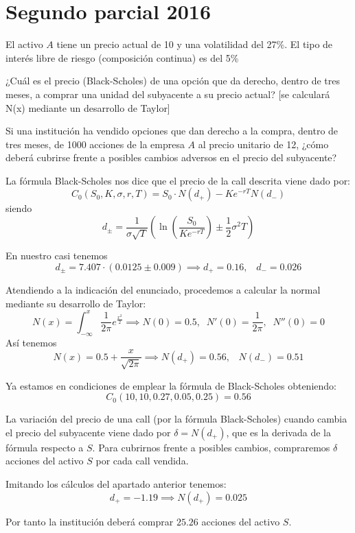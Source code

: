 \section{Segundo parcial 2016}
\begin{problem}[1]
El activo $A$ tiene un precio actual de 10 y una volatilidad del 27\%. El tipo de interés libre de riesgo (composición continua) es del 5\%

\ppart ¿Cuál es el precio (Black-Scholes) de una opción que da derecho, dentro de tres meses, a comprar una unidad del subyacente a su precio actual? [se calculará N(x) mediante un desarrollo de Taylor]

\ppart Si una institución ha vendido opciones que dan derecho a la compra, dentro de tres meses, de 1000 acciones de la empresa $A$ al precio unitario de 12, ¿cómo deberá cubrirse frente a posibles cambios adversos en el precio del subyacente?
\solution
{}

\spart

La fórmula Black-Scholes nos dice que el precio de la call descrita viene dado por:
\[C_0(S_0,K,σ,r,T) = S_0\cdot N(d_+)-Ke^{-rT}N(d_-) \]
siendo
\[d_{\pm} = \frac{1}{σ\sqrt{T}}\left(\ln\left(\frac{S_0}{Ke^{-rT}}  \right) \pm \frac{1}{2}σ^2T\right)\]

En nuestro casi tenemos
\[d_{\pm} = 7.407 \cdot \left( 0.0125 \pm 0.009\right) \implies d_+ = 0.16, \;\;\; d_- = 0.026\]

Atendiendo a la indicación del enunciado, procedemos a calcular la normal mediante su desarrollo de Taylor:
\[N(x) = \int_{-\infty}^x\frac{1}{2π}e^{\frac{x^2}{2}}\implies N(0)=0.5, \;\; N'(0) = \frac{1}{2π}, \;\; N''(0) = 0\]
Así tenemos
\[N(x) = 0.5 + \frac{x}{\sqrt{2π}}\implies N(d_+) = 0.56, \;\;\; N(d_-) = 0.51\]

Ya estamos en condiciones de emplear la fórmula de Black-Scholes obteniendo:
\[C_0(10,10,0.27,0.05,0.25) = 0.56\]

\spart
La variación del precio de una call (por la fórmula Black-Scholes) cuando cambia el precio del subyacente viene dado por $δ=N(d_+)$, que es la derivada de la fórmula respecto a $S$. Para cubrirnos frente a posibles cambios, compraremos $δ$ acciones del activo $S$ por cada call vendida.

Imitando los cálculos del apartado anterior tenemos:
\[d_+ = -1.19 \implies N(d_+) = 0.025\]

Por tanto la institución deberá comprar $25.26$ acciones del activo $S$.
\end{problem}

